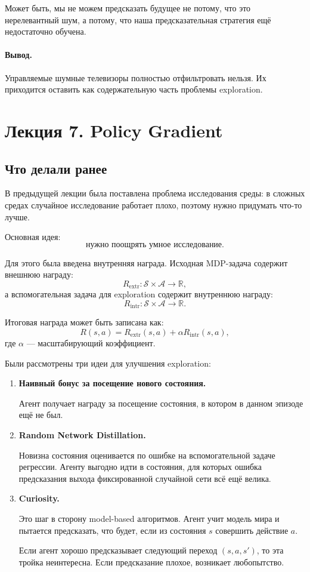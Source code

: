 \documentclass[12pt,a4paper]{article}
\begin{document}
Может быть, мы не можем предсказать будущее не потому, что это нерелевантный шум, а потому, что наша предсказательная стратегия ещё недостаточно обучена.

\paragraph{Вывод.}

Управляемые шумные телевизоры полностью отфильтровать нельзя. Их приходится оставить как содержательную часть проблемы exploration.





\section{Лекция 7. Policy Gradient}

\subsection{Что делали ранее}

В предыдущей лекции была поставлена проблема исследования среды:
в сложных средах случайное исследование работает плохо, поэтому нужно придумать что-то лучше.

Основная идея:
\[
\text{нужно поощрять умное исследование}.
\]

Для этого была введена внутренняя награда. Исходная MDP-задача содержит внешнюю награду:
\[
R_{\mathrm{extr}}:\mathcal S \times \mathcal A \to \mathbb R,
\]
а вспомогательная задача для exploration содержит внутреннюю награду:
\[
R_{\mathrm{intr}}:\mathcal S \times \mathcal A \to \mathbb R.
\]

Итоговая награда может быть записана как:
\[
R(s,a)
=
R_{\mathrm{extr}}(s,a)
+
\alpha R_{\mathrm{intr}}(s,a),
\]
где $\alpha$ --- масштабирующий коэффициент.

Были рассмотрены три идеи для улучшения exploration:

\begin{enumerate}
    \item \textbf{Наивный бонус за посещение нового состояния.}

    Агент получает награду за посещение состояния, в котором в данном эпизоде ещё не был.

    \item \textbf{Random Network Distillation.}

    Новизна состояния оценивается по ошибке на вспомогательной задаче регрессии. Агенту выгодно идти в состояния, для которых ошибка предсказания выхода фиксированной случайной сети всё ещё велика.

    \item \textbf{Curiosity.}

    Это шаг в сторону model-based алгоритмов. Агент учит модель мира и пытается предсказать, что будет, если из состояния $s$ совершить действие $a$.

    Если агент хорошо предсказывает следующий переход $(s,a,s')$, то эта тройка неинтересна. Если предсказание плохое, возникает любопытство.
\end{enumerate}
\end{document}
